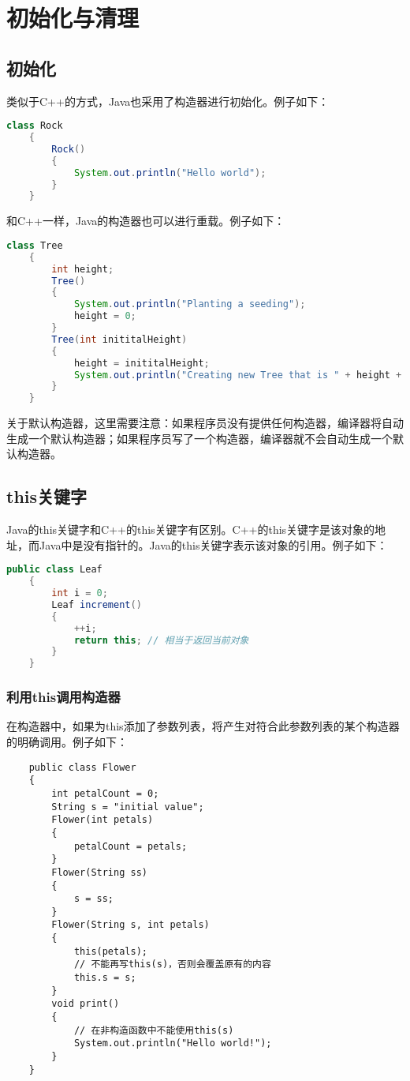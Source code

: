 \documentclass[a4paper,left=2.5cm,right=2.5cm,11pt]{article}
\begin{document}
\tableofcontents

\clearpage

\section{初始化与清理}
\subsection{初始化}
	类似于C++的方式，Java也采用了构造器进行初始化。例子如下：
	\begin{lstlisting}[language = Java]
	class Rock
	{
		Rock()
		{
			System.out.println("Hello world");
		}
	}
	\end{lstlisting}

	和C++一样，Java的构造器也可以进行重载。例子如下：
	\begin{lstlisting}[language = Java]
	class Tree
	{
		int height;
		Tree()
		{
			System.out.println("Planting a seeding");
			height = 0;
		}
		Tree(int inititalHeight)
		{
			height = inititalHeight;
			System.out.println("Creating new Tree that is " + height + " feer tall");
		}
	}
	\end{lstlisting}

	关于默认构造器，这里需要注意：如果程序员没有提供任何构造器，编译器将自动生成一个默认构造器；如果程序员写了一个构造器，编译器就不会自动生成一个默认构造器。

\subsection{this关键字}
	Java的this关键字和C++的this关键字有区别。C++的this关键字是该对象的地址，而Java中是没有指针的。Java的this关键字表示该对象的引用。例子如下：
	\begin{lstlisting}[language = Java]
	public class Leaf
	{
		int i = 0;
		Leaf increment()
		{
			++i;
			return this; // 相当于返回当前对象
		}
	}
	\end{lstlisting}
\subsubsection{利用this调用构造器}
	在构造器中，如果为this添加了参数列表，将产生对符合此参数列表的某个构造器的明确调用。例子如下：
	\begin{lstlisting}
	public class Flower
	{
		int petalCount = 0;
		String s = "initial value";
		Flower(int petals)
		{
			petalCount = petals;
		}
		Flower(String ss)
		{
			s = ss;
		}
		Flower(String s, int petals)
		{
			this(petals);
			// 不能再写this(s)，否则会覆盖原有的内容
			this.s = s;
		}
		void print()
		{
			// 在非构造函数中不能使用this(s)
			System.out.println("Hello world!");
		}
	}
	\end{lstlisting}
\end{document}
